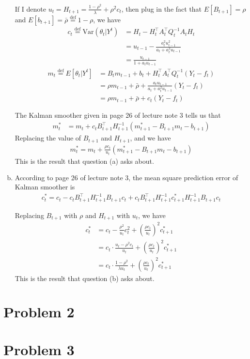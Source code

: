\documentclass[12pt]{article}
\begin{document}
\begin{enumerate}[(a)]
If I denote $u_{t} = H_{t+1} = \frac{1-\rho^2}{\lambda}+\rho^2 c_{t}$, then plug in the fact that $E[B_{t+1}] = \rho$ and $E[b_{t+1}] = \bar{\rho} \stackrel{\text{def}}{=} 1-\rho$, we have
\begin{align}
	c_{t} \stackrel{\text{def}}{=} \text{Var}\left(\left. \theta_{t} \right\vert Y^{t} \right) &= H_t - H_t^{\top} A_{t}^{\top} Q_{t}^{-1} A_{t} H_t \nonumber\\
	&= u_{t-1} - \frac{a_{t}^2 u_{t-1}^2}{a_{t} + a_{t}^2 u_{t-1}} \nonumber\\
	&=\frac{u_{t-1}}{1+a_{t}u_{t-1}}
\end{align}
\begin{align}
	m_{t} \stackrel{\text{def}}{=} E\left[ \left. \theta_{t} \right\vert Y^{t} \right] &= B_{t}m_{t-1}+b_{t}+H_{t}^{\top}A_{t}^{\top}Q_{t}^{-1}(Y_{t}-f_{t})\nonumber \\
	&= \rho m_{t-1} + \bar{\rho} + \frac{a_{t}u_{t-1}}{a_{t}+a_{t}^2 u_{t-1}} (Y_{t} - f_{t})\nonumber \\
	&= \rho m_{t-1} + \bar{\rho}  + c_{t}(Y_{t} - f_{t})
\end{align}

The Kalman smoother given in page 26 of lecture note 3 tells us that 
\begin{align}
	m_{t}^{*} &= m_{t} + c_{t}B_{t+1}^{\top} H_{t+1}^{-1}(m_{t+1}^{*} - B_{t+1}m_{t} - b_{t+1}) 
\end{align}
Replacing the value of $B_{t+1}$ and $H_{t+1}$, and we have
\begin{align}
	m_{t}^{*}= m_{t} + \frac{\rho c_{t}}{u_{t}}(m_{t+1}^{*} - B_{t+1}m_{t} - b_{t+1})
\end{align}
This is the result that question (a) asks about.

\item According to page 26 of lecture note 3, the mean square prediction error of Kalman smoother is
\begin{align}
	c_{t}^{*} = c_{t} - c_{t}B_{t+1}^{\top} H_{t+1}^{-1} B_{t+1} c_{t} + c_{t}B_{t+1}^{\top} H_{t+1}^{-1} c_{t+1}^{*} H_{t+1}^{-1} B_{t+1} c_{t}
\end{align}

Replacing $B_{t+1}$ with $\rho$ and $H_{t+1}$ with $u_{t}$, we have
\begin{align}
	c_{t}^{*} &= c_{t} - \frac{\rho^2}{u_{t}}c_{t}^2 + \left( \frac{\rho c_{t}}{u_{t}} \right)^2 c_{t+1}^{*}\nonumber \\
	&= c_{t}\cdot \frac{u_{t} - \rho^2 c_{t}}{u_{t}} + \left( \frac{\rho c_{t}}{u_{t}} \right)^2 c_{t+1}^{*}\nonumber \\
	&= c_{t}\cdot \frac{1-\rho^2}{\lambda u_{t}} + \left( \frac{\rho c_{t}}{u_{t}} \right)^2 c_{t+1}^{*}
\end{align}
This is the result that question (b) asks about.


\end{enumerate}



\section*{Problem 2}





\section*{Problem 3}


	
\end{document}
